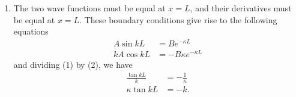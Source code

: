 \documentclass[a4paper,12pt]{article}
\begin{document}
\begin{enumerate}
\begin{enumerate}
            \item
                The two wave functions must be equal at $x = L$, and their derivatives must be equal at $x = L$. These boundary conditions give rise to the following equations
                \begin{align}
                    A\sin kL &= Be^{-\kappa L} \\
                    kA\cos kL &= -B \kappa e^{-\kappa L}
                \end{align}
                and dividing (1) by (2), we have
                \begin{align*}
                    \frac{\tan kL}{k} &= -\frac{1}{\kappa} \\
                    \kappa \tan kL &= -k.
                \end{align*}
        \end{enumerate}

\end{enumerate}
\end{document}
